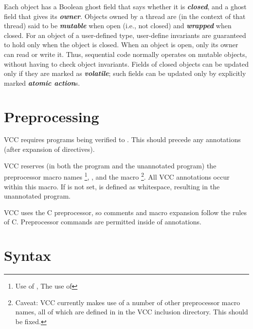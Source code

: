 \documentclass[preprint,nocopyrightspace]{sigplanconf}
\newcommand{\Def}[1]{\textit{\textbf{#1}}}
\begin{document}
Each object has a Boolean ghost field that says whether it
is \Def{closed}, and a ghost field that gives its \Def{owner}. Objects
owned by a thread are (in the context of that thread) said to
be \Def{mutable} when open (i.e., not closed) and \Def{wrapped} when
closed. For an object of a user-defined type, user-define invariants
are guaranteed to hold only when the object is closed.  When an object
is open, only its owner can read or write it. Thus, sequential code
normally operates on mutable objects, without having to check object
invariants. Fields of closed objects can be updated only if they are
marked as \Def{volatile}; such fields can be updated only by
explicitly marked \Def{atomic action}s. 


\section{Preprocessing}

VCC requires programs being verified to . This
should precede any annotations (after expansion of 
directives). 
 
VCC reserves (in both the program and the unannotated program) 
the preprocessor macro names \footnote{
Use of , 
The use of 
}, ,
and the macro \footnote{
Caveat: VCC currently makes use of a number of other preprocessor
macro names, all of which are defined in  in the VCC
inclusion directory. This should be fixed.
}.  All VCC annotations occur within this
macro. If  is not set, \vcc{_()} is defined as whitespace, 
resulting in the unannotated program.

VCC uses the C preprocessor, so comments and macro expansion follow
the rules of C. Preprocessor commands are permitted inside of annotations.

\section{Syntax}
\end{document}
